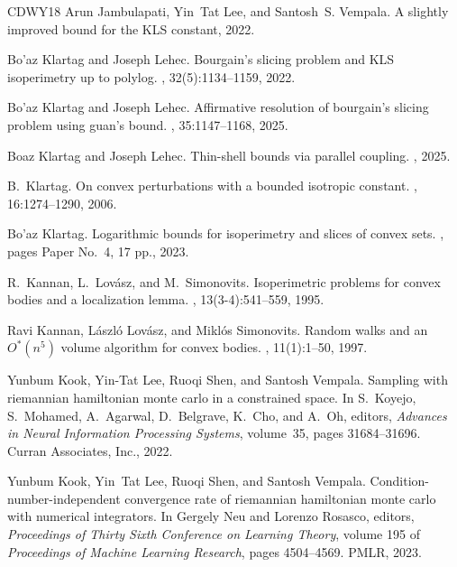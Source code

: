 \documentclass[11pt]{article}
\numberwithin{equation}{section}
\theoremstyle{definition}
\begin{document}
\begin{thebibliography}{CDWY18}
Arun Jambulapati, Yin~Tat Lee, and Santosh~S. Vempala.
\newblock A slightly improved bound for the {KLS} constant, 2022.

Bo'az Klartag and Joseph Lehec.
\newblock Bourgain's slicing problem and {KLS} isoperimetry up to polylog.
, 32(5):1134--1159, 2022.

Bo'az Klartag and Joseph Lehec.
\newblock Affirmative resolution of bourgain's slicing problem using guan's
  bound.
, 35:1147--1168, 2025.

Boaz Klartag and Joseph Lehec.
\newblock Thin-shell bounds via parallel coupling.
, 2025.

B.~Klartag.
\newblock On convex perturbations with a bounded isotropic constant.
, 16:1274--1290, 2006.

Bo'az Klartag.
\newblock Logarithmic bounds for isoperimetry and slices of convex sets.
, pages Paper No.~4, 17 pp., 2023.

R.~Kannan, L.~Lov\'asz, and M.~Simonovits.
\newblock Isoperimetric problems for convex bodies and a localization lemma.
, 13(3-4):541--559, 1995.

Ravi Kannan, L{\'a}szl{\'o} Lov{\'a}sz, and Mikl{\'o}s Simonovits.
\newblock Random walks and an {$O^*(n^5)$} volume algorithm for convex bodies.
, 11(1):1--50, 1997.

Yunbum Kook, Yin-Tat Lee, Ruoqi Shen, and Santosh Vempala.
\newblock Sampling with riemannian hamiltonian monte carlo in a constrained
  space.
\newblock In S.~Koyejo, S.~Mohamed, A.~Agarwal, D.~Belgrave, K.~Cho, and A.~Oh,
  editors, {\em Advances in Neural Information Processing Systems}, volume~35,
  pages 31684--31696. Curran Associates, Inc., 2022.

Yunbum Kook, Yin~Tat Lee, Ruoqi Shen, and Santosh Vempala.
\newblock Condition-number-independent convergence rate of riemannian
  hamiltonian monte carlo with numerical integrators.
\newblock In Gergely Neu and Lorenzo Rosasco, editors, {\em Proceedings of
  Thirty Sixth Conference on Learning Theory}, volume 195 of {\em Proceedings
  of Machine Learning Research}, pages 4504--4569. PMLR, 2023.


\end{thebibliography}
\end{document}
